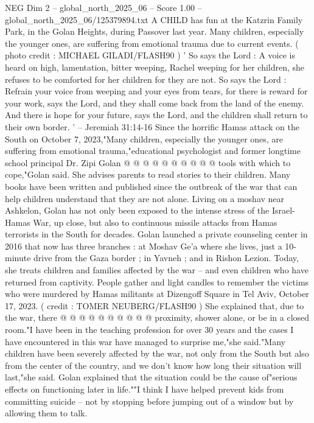 \begin{textsample}{NEG Dim 2 – global\_north\_2025\_06 – Score 1.00 – global\_north\_2025\_06/125379894.txt}  \label{ex:f2_neg_222}
A CHILD has fun at the Katzrin Family Park, in the Golan Heights, during Passover last year.
Many children, especially the younger ones, are suffering from emotional trauma due to current events. ( photo credit : MICHAEL GILADI/FLASH90 ) ' So says the Lord : A voice is heard on high, lamentation, bitter weeping, Rachel weeping for her children, she refuses to be comforted for her children for they are not.
So says the Lord : Refrain your voice from weeping and your eyes from tears, for there is reward for your work, says the Lord, and they shall come back from the land of the enemy.
And there is hope for your future, says the Lord, and the children shall return to their own border. ' -- Jeremiah 31:14-16 Since the horrific Hamas attack on the South on October 7, 2023,"Many children, especially the younger ones, are suffering from emotional trauma,"educational psychologist and former longtime school principal Dr.
Zipi Golan @ @ @ @ @ @ @ @ @ @ tools with which to cope,"Golan said.
She advises parents to read stories to their children.
Many books have been written and published since the outbreak of the war that can help children understand that they are not alone.
Living on a moshav near Ashkelon, Golan has not only been exposed to the intense stress of the Israel-Hamas War, up close, but also to continuous missile attacks from Hamas terrorists in the South for decades.
Golan launched a private counseling center in 2016 that now has three branches : at Moshav Ge'a where she lives, just a 10-minute drive from the Gaza border ; in Yavneh ; and in Rishon Lezion.
Today, she treats children and families affected by the war -- and even children who have returned from captivity.
People gather and light candles to remember the victims who were murdered by Hamas militants at Dizengoff Square in Tel Aviv, October 17, 2023. ( credit : TOMER NEUBERG/FLASH90 ) She explained that, due to the war, there @ @ @ @ @ @ @ @ @ @ proximity, shower alone, or be in a closed room."I have been in the teaching profession for over 30 years and the cases I have encountered in this war have managed to surprise me,"she said."Many children have been severely affected by the war, not only from the South but also from the center of the country, and we don't know how long their situation will last,"she said.
Golan explained that the situation could be the cause of"serious effects on functioning later in life.""I think I have helped prevent kids from committing suicide -- not by stopping before jumping out of a window but by allowing them to talk.

\end{textsample}

